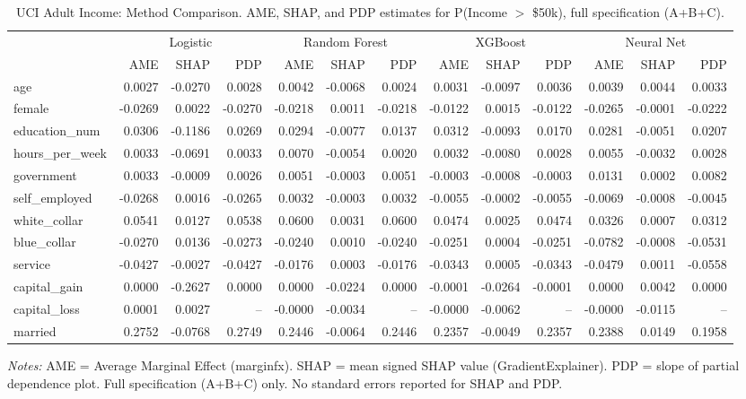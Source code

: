 \begin{table}[htbp]
\centering
\small
\begin{threeparttable}
\caption{UCI Adult Income: Method Comparison. AME, SHAP, and PDP estimates for P(Income $>$ \$50k), full specification (A+B+C).}
\label{tab:adult_method_comparison}
\begin{tabular}{lrrrrrrrrrrrr}
\toprule
 & \multicolumn{3}{c}{Logistic} & \multicolumn{3}{c}{Random Forest} & \multicolumn{3}{c}{XGBoost} & \multicolumn{3}{c}{Neural Net} \\
\cmidrule(lr){2-4} \cmidrule(lr){5-7} \cmidrule(lr){8-10} \cmidrule(lr){11-13} 
 & AME & SHAP & PDP & AME & SHAP & PDP & AME & SHAP & PDP & AME & SHAP & PDP \\
\midrule
age & 0.0027 & -0.0270 & 0.0028 & 0.0042 & -0.0068 & 0.0024 & 0.0031 & -0.0097 & 0.0036 & 0.0039 & 0.0044 & 0.0033 \\
female & -0.0269 & 0.0022 & -0.0270 & -0.0218 & 0.0011 & -0.0218 & -0.0122 & 0.0015 & -0.0122 & -0.0265 & -0.0001 & -0.0222 \\
education\_num & 0.0306 & -0.1186 & 0.0269 & 0.0294 & -0.0077 & 0.0137 & 0.0312 & -0.0093 & 0.0170 & 0.0281 & -0.0051 & 0.0207 \\
\midrule
hours\_per\_week & 0.0033 & -0.0691 & 0.0033 & 0.0070 & -0.0054 & 0.0020 & 0.0032 & -0.0080 & 0.0028 & 0.0055 & -0.0032 & 0.0028 \\
government & 0.0033 & -0.0009 & 0.0026 & 0.0051 & -0.0003 & 0.0051 & -0.0003 & -0.0008 & -0.0003 & 0.0131 & 0.0002 & 0.0082 \\
self\_employed & -0.0268 & 0.0016 & -0.0265 & 0.0032 & -0.0003 & 0.0032 & -0.0055 & -0.0002 & -0.0055 & -0.0069 & -0.0008 & -0.0045 \\
white\_collar & 0.0541 & 0.0127 & 0.0538 & 0.0600 & 0.0031 & 0.0600 & 0.0474 & 0.0025 & 0.0474 & 0.0326 & 0.0007 & 0.0312 \\
blue\_collar & -0.0270 & 0.0136 & -0.0273 & -0.0240 & 0.0010 & -0.0240 & -0.0251 & 0.0004 & -0.0251 & -0.0782 & -0.0008 & -0.0531 \\
service & -0.0427 & -0.0027 & -0.0427 & -0.0176 & 0.0003 & -0.0176 & -0.0343 & 0.0005 & -0.0343 & -0.0479 & 0.0011 & -0.0558 \\
\midrule
capital\_gain & 0.0000 & -0.2627 & 0.0000 & 0.0000 & -0.0224 & 0.0000 & -0.0001 & -0.0264 & -0.0001 & 0.0000 & 0.0042 & 0.0000 \\
capital\_loss & 0.0001 & 0.0027 & -- & -0.0000 & -0.0034 & -- & -0.0000 & -0.0062 & -- & -0.0000 & -0.0115 & -- \\
married & 0.2752 & -0.0768 & 0.2749 & 0.2446 & -0.0064 & 0.2446 & 0.2357 & -0.0049 & 0.2357 & 0.2388 & 0.0149 & 0.1958 \\
\bottomrule
\end{tabular}
\begin{tablenotes}
\footnotesize
\item \textit{Notes:} AME = Average Marginal Effect (marginfx). SHAP = mean signed SHAP value (GradientExplainer). PDP = slope of partial dependence plot. Full specification (A+B+C) only. No standard errors reported for SHAP and PDP.
\end{tablenotes}
\end{threeparttable}
\end{table}